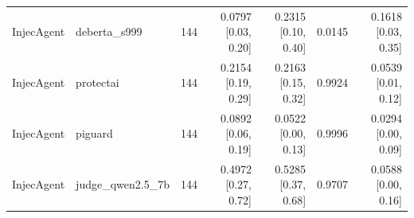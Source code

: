 \begin{tabular}{llrrrrr}
InjecAgent & deberta\_s999 & 144 & 0.0797 {\scriptsize[0.03, 0.20]} & 0.2315 {\scriptsize[0.10, 0.40]} & 0.0145 & 0.1618 {\scriptsize[0.03, 0.35]} \\
InjecAgent & protectai & 144 & 0.2154 {\scriptsize[0.19, 0.29]} & 0.2163 {\scriptsize[0.15, 0.32]} & 0.9924 & 0.0539 {\scriptsize[0.01, 0.12]} \\
InjecAgent & piguard & 144 & 0.0892 {\scriptsize[0.06, 0.19]} & 0.0522 {\scriptsize[0.00, 0.13]} & 0.9996 & 0.0294 {\scriptsize[0.00, 0.09]} \\
InjecAgent & judge\_qwen2.5\_7b & 144 & 0.4972 {\scriptsize[0.27, 0.72]} & 0.5285 {\scriptsize[0.37, 0.68]} & 0.9707 & 0.0588 {\scriptsize[0.00, 0.16]} \\
\bottomrule
\end{tabular}

